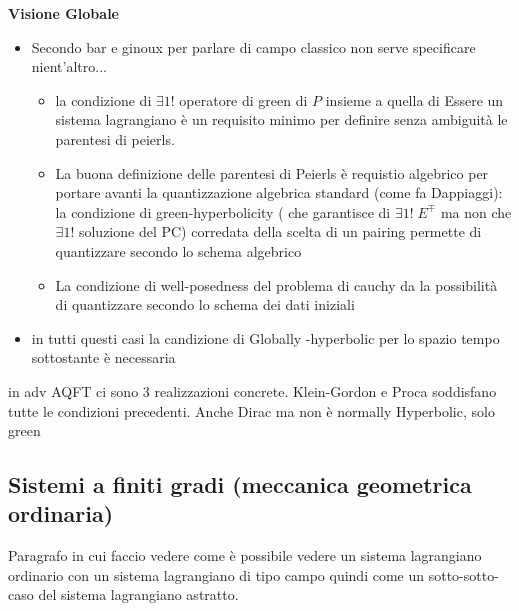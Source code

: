 \documentclass[Main]{subfiles}
\begin{document}
		\begin{remark}
			\begin{center}
				\textbf{Visione Globale}
			\end{center}
			\begin{itemize}
			\item Secondo bar e ginoux per parlare di campo classico non serve specificare nient'altro...
				\begin{itemize}
					\item la condizione di $\exists  1!$ operatore di green di $P$  insieme a quella di Essere un sistema lagrangiano è un requisito minimo  per definire senza ambiguità le parentesi di peierls.
					\item La buona definizione delle parentesi di Peierls è requistio algebrico per portare avanti la quantizzazione algebrica standard (come fa Dappiaggi): \\
					la condizione di green-hyperbolicity ( che garantisce di $\exists 1!\; E^\mp$ ma non che  $\exists 1!$ soluzione del PC) corredata della scelta di un pairing permette di quantizzare secondo lo schema algebrico
					\item La condizione di well-posedness del problema di cauchy da la possibilità di quantizzare secondo lo schema dei dati iniziali
				\end{itemize}
				\item in tutti questi casi la candizione di Globally -hyperbolic per lo spazio tempo sottostante è necessaria
			\end{itemize}
		\end{remark}
		
		\begin{example}
			in adv AQFT ci sono 3 realizzazioni concrete. Klein-Gordon e Proca soddisfano tutte le condizioni precedenti. Anche Dirac ma non è normally Hyperbolic, solo green
		\end{example}

	\subsection{Sistemi a finiti gradi (meccanica geometrica ordinaria)}
		Paragrafo in cui faccio vedere come è possibile vedere un sistema lagrangiano ordinario con un sistema lagrangiano di tipo campo quindi come un sotto-sotto-caso del sistema lagrangiano astratto.
\end{document}
